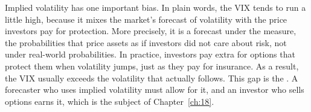 Implied volatility has one important bias. In plain words, the VIX tends to run a little high, because it mixes the market's forecast of volatility with the price investors pay for protection. More precisely, it is a forecast under the \emph{} measure, the probabilities that price assets as if investors did not care about risk, not under real-world probabilities. In practice, investors pay extra for options that protect them when volatility jumps, just as they pay for insurance. As a result, the VIX usually exceeds the volatility that actually follows. This gap is the . A forecaster who uses implied volatility must allow for it, and an investor who sells options earns it, which is the subject of Chapter~\ref{ch:18}.

